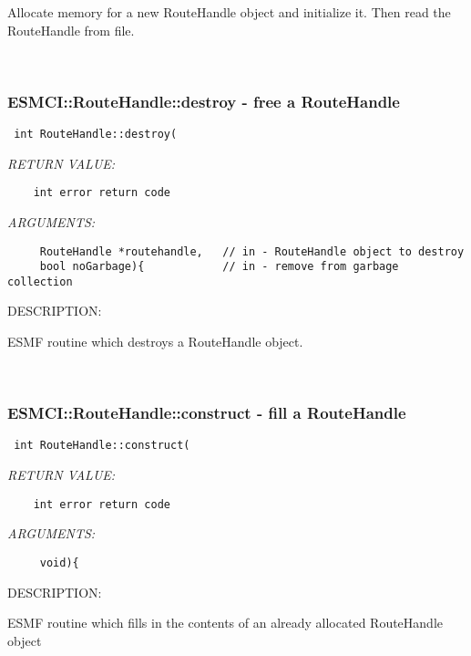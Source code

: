     Allocate memory for a new RouteHandle object and initialize it.
    Then read the RouteHandle from file.
   
 
\mbox{}\hrulefill\ 
 
\subsubsection [ESMCI::RouteHandle::destroy] {ESMCI::RouteHandle::destroy - free a RouteHandle}


  
\begin{verbatim} int RouteHandle::destroy(\end{verbatim}{\em RETURN VALUE:}
\begin{verbatim}    int error return code\end{verbatim}{\em ARGUMENTS:}
\begin{verbatim}     RouteHandle *routehandle,   // in - RouteHandle object to destroy
     bool noGarbage){            // in - remove from garbage collection\end{verbatim}
{\sf DESCRIPTION:\\ }


    ESMF routine which destroys a RouteHandle object.
   
 
\mbox{}\hrulefill\ 
 
\subsubsection [ESMCI::RouteHandle::construct] {ESMCI::RouteHandle::construct - fill a RouteHandle}


  
\begin{verbatim} int RouteHandle::construct(\end{verbatim}{\em RETURN VALUE:}
\begin{verbatim}    int error return code\end{verbatim}{\em ARGUMENTS:}
\begin{verbatim}     void){ 
   \end{verbatim}
{\sf DESCRIPTION:\\ }

 
    ESMF routine which fills in the contents of an already
    allocated RouteHandle object
   
